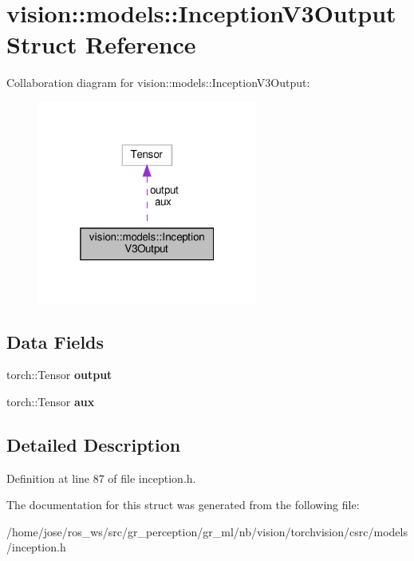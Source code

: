 \hypertarget{structvision_1_1models_1_1InceptionV3Output}{}\section{vision\+:\+:models\+:\+:Inception\+V3\+Output Struct Reference}
\label{structvision_1_1models_1_1InceptionV3Output}


Collaboration diagram for vision\+:\+:models\+:\+:Inception\+V3\+Output\+:
\nopagebreak
\begin{figure}[H]
\begin{center}
\leavevmode
\includegraphics[width=205pt]{structvision_1_1models_1_1InceptionV3Output__coll__graph}
\end{center}
\end{figure}
\subsection*{Data Fields}
\begin{DoxyCompactItemize}
\item 
\mbox{\label{structvision_1_1models_1_1InceptionV3Output_a24466480ddbb8eaf3a03ecdc0584340c}} 
torch\+::\+Tensor {\bfseries output}
\item 
\mbox{\label{structvision_1_1models_1_1InceptionV3Output_af4c6ecf48935e902dbc2fc0c12a74027}} 
torch\+::\+Tensor {\bfseries aux}
\end{DoxyCompactItemize}


\subsection{Detailed Description}


Definition at line 87 of file inception.\+h.



The documentation for this struct was generated from the following file\+:\begin{DoxyCompactItemize}
\item 
/home/jose/ros\+\_\+ws/src/gr\+\_\+perception/gr\+\_\+ml/nb/vision/torchvision/csrc/models/inception.\+h\end{DoxyCompactItemize}
